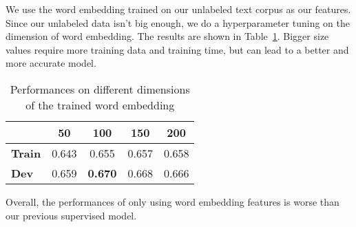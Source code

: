 We use the word embedding trained on our unlabeled text corpus as our features. Since our unlabeled data isn't big enough, we do a hyperparameter tuning on the dimension of word embedding. The results are shown in Table~\ref{tab:dimen}. Bigger size values require more training data and training time, but can lead to a better and more accurate model.

\begin{table}[ht]  %
\centering  %
\caption{Performances on different dimensions of the trained word embedding}
\begin{tabular}{lcccc}
\hline
&    \textbf{50} & \textbf{100} & \textbf{150} & \textbf{200} \\
\hline
 \textbf{Train} & 0.643 & 0.655 & 0.657 & 0.658\\
 \textbf{Dev}   & 0.659 & \textbf{0.670} & 0.668 & 0.666\\
\hline
\end{tabular}
\label{tab:dimen}
\end{table}

Overall, the performances of only using word embedding features is worse than our previous supervised model.